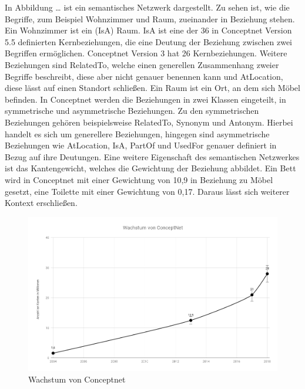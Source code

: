 In Abbildung … ist ein semantisches Netzwerk dargestellt. Zu sehen ist, wie die Begriffe, zum Beispiel Wohnzimmer und Raum, zueinander in Beziehung stehen. Ein Wohnzimmer ist ein (IsA) Raum. IsA ist eine der 36 in Conceptnet Version 5.5 definierten Kernbeziehungen, die eine Deutung der Beziehung zwischen zwei Begriffen ermöglichen. Conceptnet Version 3 hat 26 Kernbeziehungen\cite{havasi2007conceptnet}. Weitere Beziehungen sind RelatedTo, welche einen generellen Zusammenhang zweier Begriffe beschreibt, diese aber nicht genauer benennen kann und AtLocation, diese lässt auf einen Standort schließen. Ein Raum ist ein Ort, an dem sich Möbel befinden. 
In Conceptnet werden die Beziehungen in zwei Klassen eingeteilt, in symmetrische und asymmetrische Beziehungen. Zu den symmetrischen Beziehungen gehören beispielsweise RelatedTo, Synonym und Antonym. Hierbei handelt es sich um generellere Beziehungen, hingegen sind asymmetrische Beziehungen wie AtLocation, IsA, PartOf und UsedFor genauer definiert in Bezug auf ihre Deutungen. Eine weitere Eigenschaft des semantischen Netzwerkes ist das Kantengewicht, welches die Gewichtung der Beziehung abbildet. Ein Bett wird in Conceptnet mit einer Gewichtung von 10,9 in Beziehung zu Möbel gesetzt, eine Toilette mit einer Gewichtung von 0,17. Daraus lässt sich weiterer Kontext erschließen. 

\begin{figure}[h]
	
	\begin{center}
		
		\includegraphics[width=16cm]{images/Wachstum_von_ConceptNet.png}
		
		\caption{Wachstum von Conceptnet}
		
		\label{wachstum_cn}
		
	\end{center}
	
	
\end{figure}


